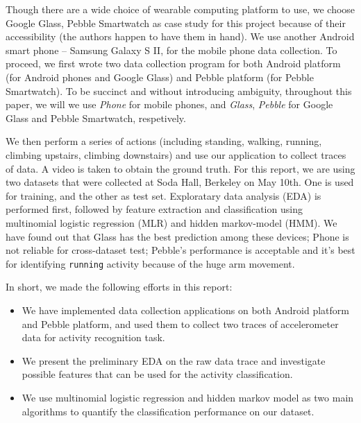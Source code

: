 Though there are a wide choice of wearable computing platform to use, we choose Google Glass, Pebble Smartwatch as case study for this project because of their accessibility (the authors happen to have them in hand). We use another Android smart phone -- Samsung Galaxy S II, for the mobile phone data collection. To proceed, we first wrote two data collection program for both Android platform (for Android phones and Google Glass) and Pebble platform (for Pebble Smartwatch). To be succinct and without introducing ambiguity, throughout this paper, we will we use {\em Phone} for mobile phones, and {\em Glass}, {\em Pebble} for Google Glass and Pebble Smartwatch, respetively. 

We then perform a series of actions (including standing, walking, running, climbing upstairs, climbing downstairs) and use our application to collect traces of data. A video is taken to obtain the ground truth. For this report, we are using two datasets that were collected at Soda Hall, Berkeley on May 10th. One is used for training, and the other as test set. Exploratary data analysis (EDA) is performed first, followed by feature extraction and classification using multinomial logistic regression (MLR) and hidden markov-model (HMM). We have found out that Glass has the best prediction among these devices; Phone is not reliable for cross-dataset test; Pebble's performance is acceptable and it's best for identifying \texttt{running} activity because of the huge arm movement.

In short, we made the following efforts in this report:
\begin{itemize}
\item We have implemented data collection applications on both Android platform and Pebble platform, and used them to collect two traces of accelerometer data for activity recognition task.
\item We present the preliminary EDA on the raw data trace and investigate possible features that can be used for the activity classification.
\item We use multinomial logistic regression and hidden markov model as two main algorithms to quantify the classification performance on our dataset.
\end{itemize}


